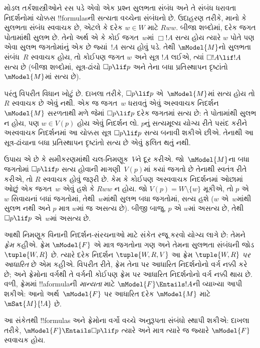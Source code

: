 \documentclass[../../../include/open-logic-section]{subfiles}
\begin{document}


મોડલ તર્કશાસ્ત્રીઓને રસ પડે એવો એક પ્રશ્ન સુલભતા
સંબંધ અને તે સંબંધ ધરાવતા નિદર્શનોમાં ચોક્કસ
!!{formula}sની સત્યતા વચ્ચેના સંબંધનો છે. ઉદાહરણ
તરીકે, માનો કે સુલભતા સંબંધ સ્વવાચક છે, એટલે કે
દરેક $w
\in W$ માટે $Rww$. બીજા શબ્દોમાં, દરેક જગત
પોતામાંથી સુલભ છે. તેનો અર્થ એ કે કોઈ જગત~$w$માં
$\Box !A$ સત્ય હોય ત્યારે $w$ પોતે પણ એવા સુલભ
જગતોમાંનું એક છે જ્યાં~$!A$ સત્ય હોવું પડે. તેથી
$\mModel{M}$નો સુલભતા સંબંધ~$R$ સ્વવાચક હોય, તો
કોઈપણ જગત $w$ અને સૂત્ર $!A$ લઈએ, ત્યાં $\Box !A
\lif !A$ સત્ય છે (બીજા શબ્દોમાં, સૂત્ર-ઢાંચો $\Box p \lif
p$ અને તેના બધા પ્રતિસ્થાપન દૃષ્ટાંતો~$\mModel{M}$માં
સત્ય છે).

પરંતુ વિપરીત વિધાન ખોટું છે. દાખલા તરીકે,
$\Box p \lif p$ એ~$\mModel{M}$માં સત્ય હોય તો $R$
સ્વવાચક છે એવું નથી. એક જ જગત~$w$ ધરાવતું એવું
અસ્વવાચક નિદર્શન~$\mModel{M}$ સરળતાથી મળે જેમાં
$\Box p \lif
p$ દરેક જગતમાં સત્ય છે: તે પોતામાંથી સુલભ
ન હોય, પણ $w \in V(p)$ હોય એવું નિદર્શન લો.
$p$નું સત્યમૂલ્ય યોગ્ય રીતે પસંદ કરીને અસ્વવાચક
નિદર્શનમાં આ ચોક્કસ સૂત્ર $\Box p \lif p$ સત્ય બનાવી શકીએ છીએ.
તેનાથી આ સૂત્ર-ઢાંચાના બધા પ્રતિસ્થાપન દૃષ્ટાંતો સત્ય છે
એવું ફલિત થતું નથી.

ઉપાય એ છે કે સમીકરણમાંથી ચલ-નિમણૂક~$V$ને દૂર કરીએ.
જો~$\mModel{M}$ના બધા જગતોમાં $\Box p \lif p$ સત્ય
હોવાની માગણી~$V(p)$માં કયાં જગતો છે તેનાથી સ્વતંત્ર
રીતે કરીએ, તો $R$ સ્વવાચક હોવું જરૂરી છે. કેમ કે
કોઈપણ અસ્વવાચક નિદર્શનમાં ઓછામાં ઓછું એક જગત~$w$
એવું હશે કે $Rww$ ન હોય. જો $V(p) =
W \setminus \{w\}$ મૂકીએ, તો $p$ એ~$w$ સિવાયનાં
બધાં જગતોમાં, તેથી~$w$માંથી સુલભ બધા જગતોમાં,
સત્ય હશે ($w$ એ~$w$માંથી સુલભ નથી અને $p$ માત્ર
$w$માં જ અસત્ય છે). બીજી બાજુ, $p$ એ $w$માં
અસત્ય છે, તેથી $\Box
p \lif p$ એ~$w$માં અસત્ય છે.

આથી નિમણૂક વિનાની નિદર્શન-સંરચનાઓ માટે સંકેત
રજૂ કરવો યોગ્ય લાગે છે: તેમને \emph{ફ્રેમ} કહીએ.
ફ્રેમ $\mModel{F}$ એ માત્ર જગતોના ગણ અને તેમના
સુલભતા સંબંધની જોડ $\tuple{W, R}$ છે. ત્યારે
દરેક નિદર્શન $\tuple{W, R, V}$ આ ફ્રેમ
$\tuple{W, R}$ \emph{પર આધારિત} છે એમ કહીએ.
વિપરીત રીતે, ફ્રેમ તેના પર આધારિત નિદર્શનોનો
વર્ગ નક્કી કરે છે; અને ફ્રેમોના વર્ગથી તે વર્ગની
કોઈપણ ફ્રેમ પર આધારિત નિદર્શનોનો વર્ગ નક્કી થાય છે.
વળી, ફ્રેમમાં !!a{formula}ની \emph{માન્યતા} માટે
$\mModel{F} \Entails !A$ની વ્યાખ્યા આપી શકીએ: આનો
અર્થ~$\mModel{F}$ પર આધારિત દરેક $\mModel{M}$ માટે
$\mSat{M}{!A}$ છે.

આ સંકેતથી !!{formula}s અને ફ્રેમોના વર્ગો વચ્ચે
અનુરૂપતા સંબંધો સ્થાપી શકીએ: દાખલા તરીકે,
$\mModel{F} \Entails \Box p \lif p$ ત્યારે અને માત્ર
ત્યારે જ જ્યારે $\mModel{F}$ સ્વવાચક હોય.
\end{document}
